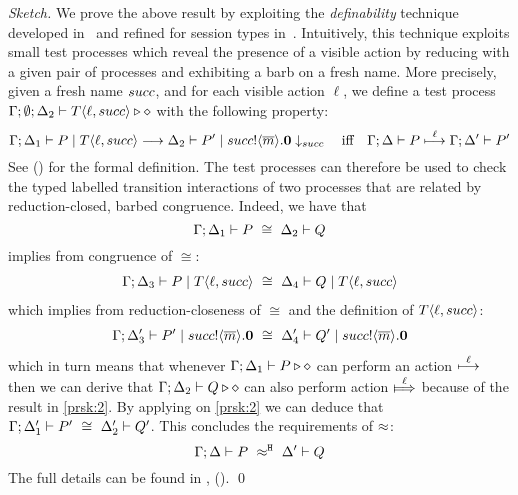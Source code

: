 \begin{proof}[Sketch]	
	We prove the above result by exploiting
the \emph{definability} technique developed in~\cite[\S6.7]{Hennessy07} and
refined for session types in~\cite{KYHH2015,KY2015}.
Intuitively, this technique exploits small test processes which
reveal the presence of a visible action by reducing with a given pair of processes
and exhibiting a barb on a fresh name.
More precisely, given a fresh name $succ$, and for each visible action $\ell$, we define 
		a  test process
	$\Gamma; \emptyset; \Delta_2 \vdash T\langle \ell, succ \rangle \triangleright \diamond$
	with the following property:
%
	\[
		\Gamma; \Delta_1 \vdash P \;|\; T\langle \ell, succ \rangle \longrightarrow \Delta_2 \vdash P' \;|\; succ ! \langle \overline{m} \rangle . \mathbf{0} \downarrow_{succ}
		\quad \mbox{iff} \quad
		\Gamma; \Delta \vdash P \stackrel{\ell}{\longmapsto} \Gamma; \Delta' \vdash P'
	\]
%
	See  () for the formal definition.
	The test processes can therefore be used to check the
	typed labelled transition interactions of two
	processes that are related by reduction-closed,
	barbed congruence. Indeed, we have that 
	\[
		\Gamma; \Delta_1 \vdash P\ \cong\ \Delta_2 \vdash Q
	\]
	implies from congruence of $\cong$:
	\begin{eqnarray*}
		\Gamma; \Delta_3 \vdash P \;|\; T\langle \ell, succ \rangle\ \cong\ \Delta_4 \vdash Q \;|\; T\langle \ell, succ \rangle
	\end{eqnarray*}
	which implies from reduction-closeness of $\cong$ and the definition of $T\langle \ell, succ \rangle$:
	\begin{eqnarray}
		\Gamma; \Delta_3' \vdash P' \;|\; succ ! \langle \overline{m} \rangle . \mathbf{0}\ \cong\ \Delta_4' \vdash Q' \;|\; succ ! \langle \overline{m} \rangle . \mathbf{0}
		\label{prsk:2}
	\end{eqnarray}
	which in turn means that whenever $\Gamma; \Delta_1 \vdash P \triangleright \diamond$ can
	perform an action $\stackrel{\ell}{\longmapsto}$ then we can derive that $\Gamma; \Delta_2 \vdash Q \triangleright \diamond$
	can also perform action $\Hby{\ell}$ because of the result in \eqref{prsk:2}.
	By applying  on \eqref{prsk:2} we can deduce that
	$\Gamma; \Delta_1' \vdash P'\ \cong\ \Delta_2' \vdash Q'$.
	This concludes the requirements of  $\approx$: %
	\[
		\Gamma; \Delta \vdash P\ \approx^\mathtt{H}\ \Delta' \vdash Q
	\]
	The full details can be found in  ,  ().
	\qed
\end{proof}

